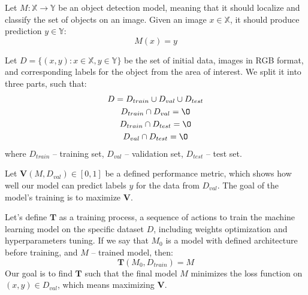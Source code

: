 \documentclass[14pt,a4paper]{extarticle}
\newcounter{e}
\numberwithin{equation}{section}
\numberwithin{figure}{section}
\begin{document}
Let $M: \mathbb{X} \rightarrow \mathbb{Y}$ be an object detection model, meaning that it should localize and classify the set of objects on an image. Given an image $x \in \mathbb{X}$, it should produce prediction $y \in \mathbb{Y}$:
\begin{equation}
    M(x)=y
\end{equation}

Let $D = \{(x, y): x \in \mathbb{X}, y \in \mathbb{Y}\}$ be the set of initial data, images in RGB format, and corresponding labels for the object from the area of interest. We split it into three parts, such that:
\begin{equation}
    \begin{gathered}
        D = D_{train} \cup D_{val} \cup D_{test} \\
        D_{train} \cap D_{val} = \O\\
        D_{train} \cap D_{test} = \O\\
        D_{val} \cap D_{test} = \O\\
    \end{gathered}
\end{equation}
where $D_{train}$ -- training set, $D_{val}$ --  validation set, $D_{test}$ -- test set.

Let $\mathbf{V}(M, D_{val}) \in [0, 1]$ be a defined performance metric, which shows how well our model can predict labels $y$ for the data from $D_{val}$. The goal of the model's training is to maximize $\mathbf{V}$.

Let's define $\mathbf{T}$ as a training process, a sequence of actions to train the machine learning model on the specific dataset $D$, including weights optimization and hyperparameters tuning. If we say that $M_{0}$ is a model with defined architecture before training, and $M$ -- trained model, then:
\begin{equation}
    \mathbf{T}(M_{0}, D_{train}) = M  
\end{equation}
Our goal is to find $\mathbf{T}$ such that the final model $M$ minimizes the loss function on $(x, y) \in D_{val}$, which means maximizing $\mathbf{V}$. 
\end{document}
